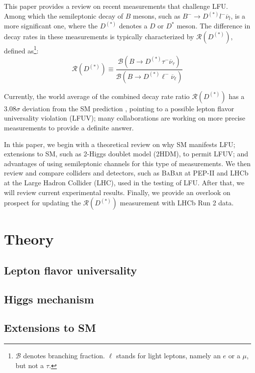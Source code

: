 \documentclass[12pt,letterpaper]{article}
\def\BaBar/{\textsc{BaBar}}
\def\RDDst/{\ensuremath{\mathcal{R}(D^{(*)})}}
\begin{document}
This paper provides a review on recent measurements that challenge LFU.
Among which the semileptonic decay of $B$ mesons, such as
$B^- \rightarrow D^{(*)} l^- \overline{\nu}_l$, is a more significant one, where the $D^{(*)}$ denotes a $D$ or $D^*$ meson.
The difference in decay rates in these measurements is typically characterized by \RDDst/,
defined as\footnote{
    $\mathcal{B}$ denotes branching fraction.
    $\ell$ stands for light leptons, namely an $e$ or a $\mu$, but not a $\tau$.
}:
\begin{equation}
    \RDDst/ \equiv \frac{
        \mathcal{B}\left(
            B \rightarrow D^{(*)} \tau^- \overline{\nu}_\tau
        \right)
    }{
        \mathcal{B}\left(
            B \rightarrow D^{(*)} \ell^- \overline{\nu}_\ell
        \right)
    }
\end{equation}

Currently, the world average of the combined decay rate ratio \RDDst/
has a $3.08\sigma$ deviation from the SM prediction \cite{HFLAV:2019}, pointing
to a possible lepton flavor universality violation (LFUV);
many collaborations are working on more precise measurements to provide a
definite answer.

In this paper, we begin with a theoretical review on why SM manifests LFU;
extensions to SM, such as 2-Higgs doublet model (2HDM), to permit LFUV;
and advantages of using semileptonic channels for this type of measurements.
We then review and compare colliders and detectors, such as \BaBar/ at PEP-II
and LHCb at the Large Hadron Collider (LHC), used in the testing of LFU.
After that, we will review current experimental results.
Finally, we provide an overlook on prospect for updating the \RDDst/ measurement with LHCb Run
2 data.

\section{Theory}
\subsection{Lepton flavor universality} \label{sec:lfu}


\subsection{Higgs mechanism}


\subsection{Extensions to SM}

\end{document}
